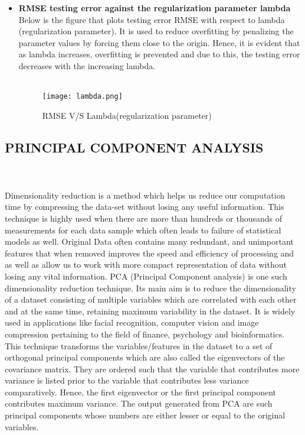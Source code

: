 \documentclass{article}
\begin{document}
\begin{itemize}
\begin{itemize}
 \newpage
   \item \textbf{RMSE testing error against the regularization parameter lambda } \\
     Below is the figure that plots testing error RMSE with respect to lambda (regularization parameter). It is used to reduce overfitting by penalizing the parameter values by forcing them close to the origin. Hence, it is evident that as lambda increases, overfitting is prevented and due to this, the testing error decreases with the increasing lambda. \\ \\
     \begin{figure}[H]
     \centering
    \texttt{[image: lambda.png]}
    \caption{RMSE V/S Lambda(regularization parameter)}
    \label{fig:Caption}
    \end{figure}
\end{itemize}

\end{itemize}

\newpage

\subsection {\color{blue}
\textbf{PRINCIPAL COMPONENT ANALYSIS}} \\ \\
Dimensionality reduction is a method which helps us reduce our computation time by compressing the data-set without losing any useful information. This technique is highly used when there are more than  hundreds or thousands of measurements for each data sample which often leads to failure of statistical models as well. Original Data often contains many redundant, and unimportant features that when removed improves the speed and efficiency of processing and as well as allow us to work with more compact representation of data without losing any vital information. PCA (Principal Component analysis) is one such dimensionality reduction technique. Its main aim is to reduce the dimensionality of a dataset consisting of multiple variables which are correlated with each other and at the same time, retaining maximum variability in the dataset.  It is widely used in applications like facial recognition, computer vision and image compression pertaining to the field of finance, psychology and bioinformatics. This technique transforms the variables/features in the dataset to a set of orthogonal principal components which are also called the eigenvectors of the covariance matrix. They are ordered such that the variable that contributes more variance is listed prior to the variable that contributes less variance comparatively. Hence, the first eigenvector or the first principal component contributes maximum variance. The output generated from PCA are such principal components whose numbers are either lesser or equal to the original variables. 
\end{document}
